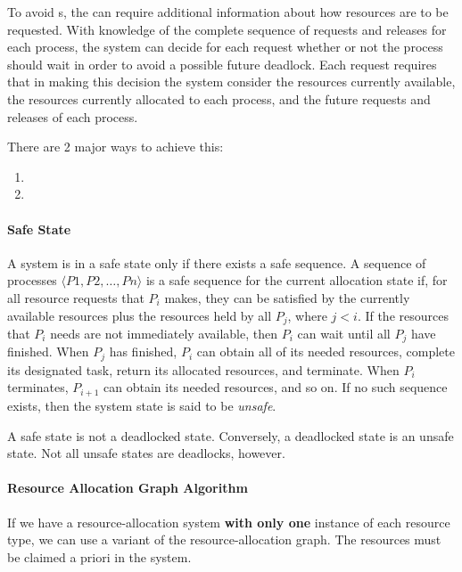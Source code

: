 To avoid s, the  can require additional information about how resources are to be requested.
With knowledge of the complete sequence of requests and releases for each process, the system can decide for each request whether or not the process should wait in order to avoid a possible future deadlock.
Each request requires that in making this decision the system consider the resources currently available, the resources currently allocated to each process, and the future requests and releases of each process.

There are 2 major ways to achieve this:
\begin{enumerate}[noitemsep]
\item {}
\item {}
\end{enumerate}

\paragraph{Safe State}\label{par:Deadlock_Avoidance-Safe_State}
A system is in a safe state only if there exists a safe sequence.
A sequence of processes $\langle P 1, P 2 , \ldots, P n \rangle$ is a safe sequence for the current allocation state if, for all resource requests that $P_{i}$ makes, they can be satisfied by the currently available resources plus the resources held by all $P_{j}$, where $j < i$.
If the resources that $P_{i}$ needs are not immediately available, then $P_{i}$ can wait until all $P_{j}$ have finished.
When $P_{j}$ has finished, $P_{i}$ can obtain all of its needed resources, complete its designated task, return its allocated resources, and terminate.
When $P_{i}$ terminates, $P_{i+1}$ can obtain its needed resources, and so on.
If no such sequence exists, then the system state is said to be \emph{unsafe}.

\begin{blackbox}
  A safe state is not a deadlocked state.
  Conversely, a deadlocked state is an unsafe state.
  Not all unsafe states are deadlocks, however.
\end{blackbox}

\paragraph{Resource Allocation Graph Algorithm}\label{par:Deadlock_Avoidance-Resource_Allocation_Graph}
If we have a resource-allocation system \textbf{with only one} instance of each resource type, we can use a variant of the resource-allocation graph.
The resources must be claimed a priori in the system.

